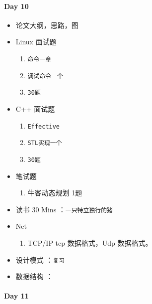 \documentclass[UTF8,a4paper,8pt]{ctexart}
\begin{document}
	 	  
 	 \paragraph{Day 10      \quad     }
	 	 \begin{itemize}[itemindent = 1em]
	 	 	\renewcommand\labelitemi{\makebox[0pt][l]{$\square$}\hspace{1em}} 
	 	 	\renewcommand\labelitemi{\makebox[0pt][l]{$\square$}\raisebox{.15ex}{\hspace{0.1em}$\checkmark$}}	
	 	 	\item   论文大纲，思路，图 	
	 	 	\item   Linux 面试题
	 	 	\begin{enumerate}
	 	 		\item \verb|命令一章|
	 	 		\item \verb|调试命令一个|
	 	 		\item \verb|30题|
	 	 	\end{enumerate}
	 	 	\item   C++   面试题
	 	 	\begin{enumerate}
	 	 		\item \verb|Effective|
	 	 		\item \verb|STL实现一个|
	 	 		\item \verb|30题|
	 	 	\end{enumerate}
	 	 	
	 	 	\item  笔试题
	 	 	\begin{enumerate}
	 	 		\item 牛客动态规划 1题
	 	 	\end{enumerate}
	 	 	
	 	 	\item   读书  30 Mins	：\verb|一只特立独行的猪|
	 	 	\item   Net
	 	 	\begin{enumerate}
	 	 		\item TCP/IP  tcp 数据格式，Udp 数据格式。
	 	 	\end{enumerate}	
	 	 	
	 	 	\renewcommand\labelitemi{\makebox[0pt][l]{$\square$}\hspace{1em}}
	 	 	\item   设计模式 ：\verb|复习| 
	 	 	\item   数据结构 ：\verb|| 
	 	 \end{itemize}
	 	 
 	 \paragraph{Day 11      \quad     }
\end{document}
